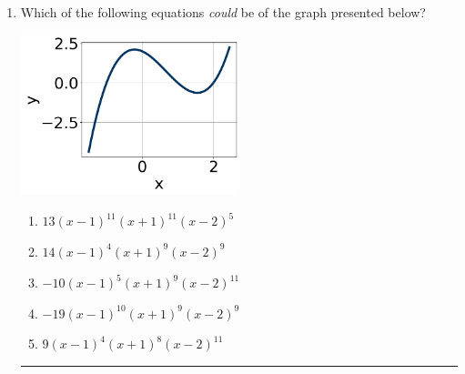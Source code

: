 \documentclass[14pt]{extbook}
\newcommand{\litem}[1]{\item#1\hspace*{-1cm}\rule{\textwidth}{0.4pt}}
\begin{document}
\begin{enumerate}
{\begin{enumerate}[label=\Alph*.]
\end{enumerate} }
\litem{
Which of the following equations \textit{could} be of the graph presented below?
\begin{center}
    \includegraphics[width=0.5\textwidth]{../Figures/polyGraphToFunctionCopyB.png}
\end{center}
\begin{enumerate}[label=\Alph*.]
\item \( 13(x - 1)^{11} (x + 1)^{11} (x - 2)^{5} \)
\item \( 14(x - 1)^{4} (x + 1)^{9} (x - 2)^{9} \)
\item \( -10(x - 1)^{5} (x + 1)^{9} (x - 2)^{11} \)
\item \( -19(x - 1)^{10} (x + 1)^{9} (x - 2)^{9} \)
\item \( 9(x - 1)^{4} (x + 1)^{8} (x - 2)^{11} \)

\end{enumerate} }
\end{enumerate}
\end{document}
